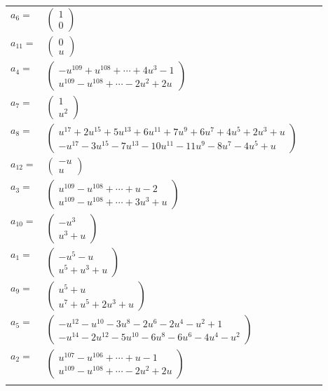 \documentclass[1p]{elsarticle_modified}
\theoremstyle{definition}
\begin{document}
\begin{tabular}{m{7pt} m{180pt} m{7pt} m{180pt} }
\flushright $a_{6}=$&$\begin{pmatrix}1\\0\end{pmatrix}$ \\
\flushright $a_{11}=$&$\begin{pmatrix}0\\u\end{pmatrix}$ \\
\flushright $a_{4}=$&$\begin{pmatrix}- u^{109}+u^{108}+\cdots+4 u^3-1\\u^{109}- u^{108}+\cdots-2 u^2+2 u\end{pmatrix}$ \\
\flushright $a_{7}=$&$\begin{pmatrix}1\\u^2\end{pmatrix}$ \\
\flushright $a_{8}=$&$\begin{pmatrix}u^{17}+2 u^{15}+5 u^{13}+6 u^{11}+7 u^9+6 u^7+4 u^5+2 u^3+u\\- u^{17}-3 u^{15}-7 u^{13}-10 u^{11}-11 u^9-8 u^7-4 u^5+u\end{pmatrix}$ \\
\flushright $a_{12}=$&$\begin{pmatrix}- u\\u\end{pmatrix}$ \\
\flushright $a_{3}=$&$\begin{pmatrix}u^{109}- u^{108}+\cdots+u-2\\u^{109}- u^{108}+\cdots+3 u^3+u\end{pmatrix}$ \\
\flushright $a_{10}=$&$\begin{pmatrix}- u^3\\u^3+u\end{pmatrix}$ \\
\flushright $a_{1}=$&$\begin{pmatrix}- u^5- u\\u^5+u^3+u\end{pmatrix}$ \\
\flushright $a_{9}=$&$\begin{pmatrix}u^5+u\\u^7+u^5+2 u^3+u\end{pmatrix}$ \\
\flushright $a_{5}=$&$\begin{pmatrix}- u^{12}- u^{10}-3 u^8-2 u^6-2 u^4- u^2+1\\- u^{14}-2 u^{12}-5 u^{10}-6 u^8-6 u^6-4 u^4- u^2\end{pmatrix}$ \\
\flushright $a_{2}=$&$\begin{pmatrix}u^{107}- u^{106}+\cdots+u-1\\u^{109}- u^{108}+\cdots-2 u^2+2 u\end{pmatrix}$\\&\end{tabular}
\end{document}
